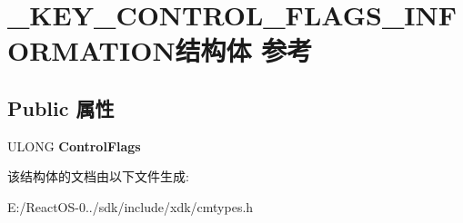 \hypertarget{struct___k_e_y___c_o_n_t_r_o_l___f_l_a_g_s___i_n_f_o_r_m_a_t_i_o_n}{}\section{\+\_\+\+K\+E\+Y\+\_\+\+C\+O\+N\+T\+R\+O\+L\+\_\+\+F\+L\+A\+G\+S\+\_\+\+I\+N\+F\+O\+R\+M\+A\+T\+I\+O\+N结构体 参考}
\label{struct___k_e_y___c_o_n_t_r_o_l___f_l_a_g_s___i_n_f_o_r_m_a_t_i_o_n}
\subsection*{Public 属性}
\begin{DoxyCompactItemize}
\item 
\mbox{\label{struct___k_e_y___c_o_n_t_r_o_l___f_l_a_g_s___i_n_f_o_r_m_a_t_i_o_n_aaa63089d44e619b0c33467955d9657e5}} 
U\+L\+O\+NG {\bfseries Control\+Flags}
\end{DoxyCompactItemize}


该结构体的文档由以下文件生成\+:\begin{DoxyCompactItemize}
\item 
E\+:/\+React\+O\+S-\/0../sdk/include/xdk/cmtypes.\+h\end{DoxyCompactItemize}
